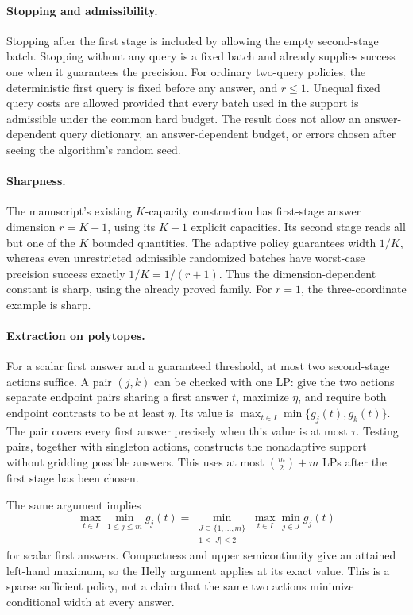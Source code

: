 \paragraph{Stopping and admissibility.}
Stopping after the first stage is included by allowing the empty
second-stage batch. Stopping without any query is a fixed batch and
already supplies success one when it guarantees the precision.
For ordinary two-query policies, the deterministic first query is fixed
before any answer, and $r\leq1$. Unequal fixed query costs are allowed
provided that every batch used in the support is admissible under the
common hard budget. The result does not allow an answer-dependent query
dictionary, an answer-dependent budget, or errors chosen after seeing
the algorithm's random seed.

\paragraph{Sharpness.}
The manuscript's existing $K$-capacity construction has first-stage
answer dimension $r=K-1$, using its $K-1$ explicit capacities. Its second
stage reads all but one of the $K$ bounded quantities. The adaptive policy
guarantees width $1/K$, whereas even unrestricted admissible randomized
batches have worst-case precision success exactly $1/K=1/(r+1)$.
Thus the dimension-dependent constant is sharp, using the already proved
family. For $r=1$, the three-coordinate example is sharp.

\paragraph{Extraction on polytopes.}
For a scalar first answer and a guaranteed threshold, at most two
second-stage actions suffice. A pair $(j,k)$ can be checked with one LP:
give the two actions separate endpoint pairs sharing a first answer $t$,
maximize $\eta$, and require both endpoint contrasts to be at least
$\eta$. Its value is $\max_{t\in I}\min\{g_j(t),g_k(t)\}$.
The pair covers every first answer precisely when this value is at most
$\tau$. Testing pairs, together with singleton actions, constructs the
nonadaptive support without gridding possible answers. This uses at most
$\binom{m}{2}+m$ LPs after the first stage has been chosen.

The same argument implies
\[
 \max_{t\in I}\min_{1\leq j\leq m}g_j(t)
 =\min_{\substack{J\subseteq\{1,\ldots,m\}\\1\leq|J|\leq2}}
     \max_{t\in I}\min_{j\in J}g_j(t)
\]
for scalar first answers. Compactness and upper semicontinuity give an
attained left-hand maximum, so the Helly argument applies at its exact
value. This is a sparse sufficient policy, not a claim that the same two
actions minimize conditional width at every answer.
